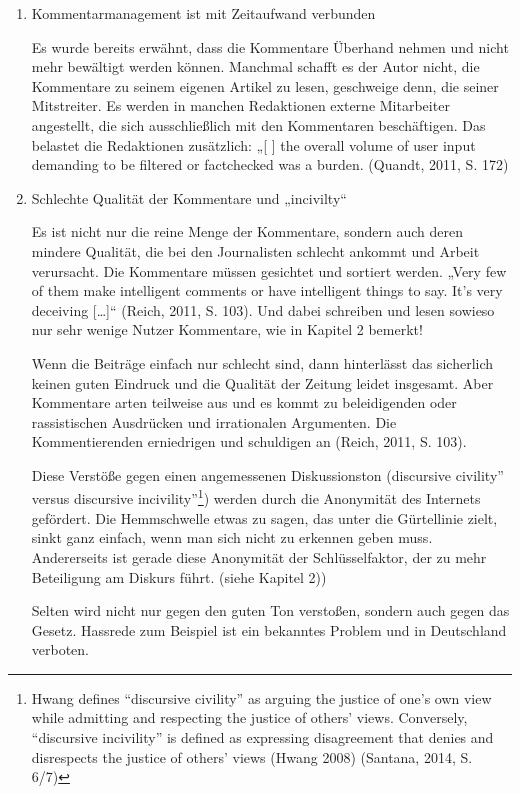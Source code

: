 \begin{enumerate}
\item Kommentarmanagement ist mit Zeitaufwand verbunden

Es wurde bereits erwähnt, dass die Kommentare
Überhand nehmen und nicht mehr bewältigt werden können. Manchmal schafft es der
Autor nicht, die Kommentare zu seinem eigenen Artikel zu lesen, geschweige denn,
die seiner Mitstreiter. Es werden in manchen Redaktionen externe Mitarbeiter
angestellt, die sich ausschließlich mit den Kommentaren beschäftigen. Das
belastet die Redaktionen zusätzlich: „[ ] the overall volume of user input
demanding to be filtered or factchecked was a burden. (Quandt, 2011, S. 172)


\item Schlechte Qualität der Kommentare und „incivilty“

Es ist nicht nur die reine Menge der Kommentare, sondern auch deren mindere
Qualität, die bei den Journalisten schlecht ankommt und Arbeit verursacht. Die
Kommentare müssen gesichtet und sortiert werden. „Very few of them make
intelligent comments or have intelligent things to say. It's very deceiving
[\ldots]“ (Reich, 2011, S. 103).  Und dabei schreiben und lesen sowieso nur sehr
wenige Nutzer Kommentare, wie in Kapitel 2 bemerkt!




Wenn die Beiträge einfach nur schlecht sind, dann hinterlässt das sicherlich
keinen guten Eindruck und die Qualität der Zeitung leidet insgesamt. Aber
Kommentare arten teilweise aus und es kommt zu beleidigenden oder rassistischen
Ausdrücken und irrationalen Argumenten. Die Kommentierenden erniedrigen und
schuldigen an (Reich, 2011, S. 103).

Diese Verstöße gegen einen angemessenen Diskussionston
(\glqq discursive civility” versus \glqq discursive incivility”\footnote{Hwang defines
“discursive civility” as arguing the justice of one’s own view while admitting
and respecting the justice of others’ views. Conversely, “discursive incivility”
is defined as expressing disagreement that denies and disrespects the justice of
others’  views (Hwang 2008) (Santana, 2014, S. 6/7)})
werden durch die Anonymität des Internets gefördert. Die Hemmschwelle etwas zu
sagen, das unter die Gürtellinie zielt, sinkt ganz einfach, wenn man sich nicht
zu erkennen geben muss. Andererseits ist gerade diese Anonymität der
Schlüsselfaktor, der zu mehr Beteiligung am Diskurs führt. (siehe Kapitel 2))

Selten wird nicht nur gegen den guten Ton verstoßen, sondern auch gegen das
Gesetz. Hassrede zum Beispiel ist ein bekanntes Problem und in Deutschland
verboten.


\end{enumerate}
